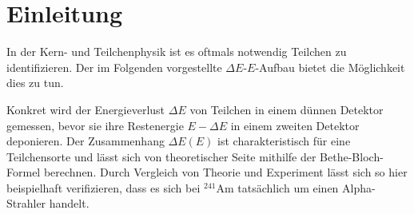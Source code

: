 \section{Einleitung}

In der Kern- und Teilchenphysik ist es oftmals notwendig Teilchen zu identifizieren. Der im Folgenden vorgestellte $\Delta E$-$E$-Aufbau bietet die Möglichkeit dies zu tun.

Konkret wird der Energieverlust $\Delta E$ von Teilchen in einem dünnen Detektor gemessen, bevor sie ihre Restenergie $E-\Delta E$ in einem zweiten Detektor deponieren. Der Zusammenhang $\Delta E(E)$ ist charakteristisch für eine Teilchensorte und lässt sich von theoretischer Seite mithilfe der Bethe-Bloch-Formel berechnen. Durch Vergleich von Theorie und Experiment lässt sich so hier beispielhaft verifizieren, dass es sich bei $^{241}$Am tatsächlich um einen Alpha-Strahler handelt. 

